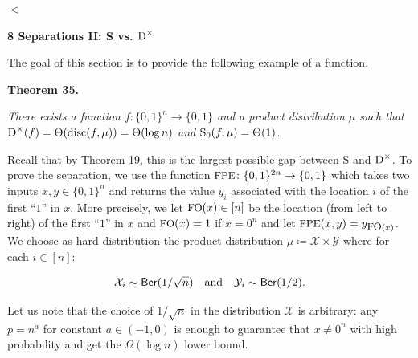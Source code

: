 $\vartriangleleft$\par






\par\medskip\noindent\textbf{
8 Separations II: S vs. ${\textup{D}}^{\times}$
}\par




The goal of this section is to provide the following example of a function.\par





\par\medskip\noindent\textbf{
\textbf{Theorem 35}\textbf{.}
}\par



\emph{There exists a function $f\colon\{0,1\}^{n}\to\{0,1\}$ and a product distribution $\mu$ such that ${\textup{D}}^{\times}(f)=\Theta({\textup{disc}}(f,\mu))=\Theta(\log n)$ and ${\textup{S}}_{0}(f,\mu)=\Theta(1)$.}\par






Recall that by Theorem 19, this is the largest possible gap between S and ${\textup{D}}^{\times}$. To prove the separation, we use the function ${\textrm{\small{FPE}}}\colon\{0,1\}^{2n}\to\{0,1\}$ which takes two inputs $x,y\in\{0,1\}^{n}$ and returns the value $y_{i}$ associated with the location $i$ of the first “$1$” in $x$. More precisely, we let ${\textrm{\small{FO}}}(x)\in[n]$ be the location (from left to right) of the first “$1$” in $x$ and ${\textrm{\small{FO}}}(x)=1$ if $x=0^{n}$ and let ${\textrm{\small{FPE}}}(x,y)=y_{{\textrm{\small{FO}}}(x)}$. We choose as hard distribution the product distribution $\mu\coloneqq\mathcal{X}\times\mathcal{Y}$ where for each $i\in[n]$:\par


\[\begin{gathered}
\mathcal{X}_{i}\sim\mathsf{Ber}(1/\sqrt{n})\quad\textup{and}\quad\mathcal{Y}_{i}\sim\mathsf{Ber}(1/2).
\end{gathered}\]


Let us note that the choice of $1/\sqrt{n}$ in the distribution $\mathcal{X}$ is arbitrary: any $p=n^{a}$ for constant $a\in(-1,0)$ is enough to guarantee that $x\neq 0^{n}$ with high probability and get the $\Omega(\log n)$ lower bound.\par




